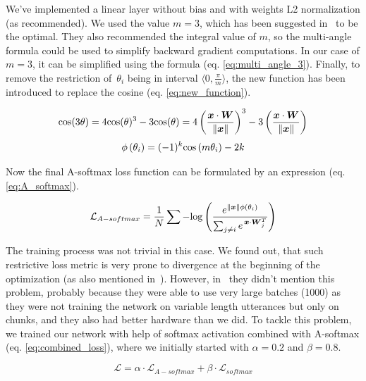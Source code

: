 \medskip
We've implemented a linear layer without bias and with weights L2 normalization (as recommended). We used the value $ m = 3 $, which has been suggested in~\cite{A_softmax} to be the optimal. They also recommended the integral value of $ m $, so the multi-angle formula could be used to simplify backward gradient computations. In our case of $ m = 3 $, it can be simplified using the formula (eq. \ref{eq:multi_angle_3}). Finally, to remove the restriction of~$ \theta_i $ being in interval $ \langle 0, \frac{\pi}{m} \rangle $, the new function has been introduced to replace the cosine (eq. \ref{eq:new_function}).

\begin{equation} \label{eq:multi_angle_3}
\textnormal{cos}(3\theta) =
4\textnormal{cos}(\theta)^3 - 3\textnormal{cos}(\theta) =
4 \left( \frac{\boldsymbol{x} \cdot \boldsymbol{W}}{\lVert\boldsymbol{x}\rVert} \right) ^3 -
3 \left( \frac{\boldsymbol{x} \cdot \boldsymbol{W}}{\lVert\boldsymbol{x}\rVert} \right)
\end{equation}
\begin{equation} \label{eq:new_function}
\phi \left( \theta_i \right) =
(-1)^k \textnormal{cos} \left( m \theta_i \right) - 2k
\end{equation}

\medskip
\noindent
Now the final A-softmax loss function can be formulated by an expression (eq. \ref{eq:A_softmax}).

\begin{equation} \label{eq:A_softmax}
\mathcal{L}_{A-softmax} = \frac{1}{N} \sum - \textnormal{log} \left(
\frac{e^{\lVert\boldsymbol{x}\rVert \phi(\theta_i)}}
{\sum_{j \neq i} e^{\,\boldsymbol{x} \cdot \boldsymbol{W}_j^T}}
\right)
\end{equation}

\medskip
\noindent
The training process was not trivial in this case. We found out, that such restrictive loss metric is very prone to divergence at the beginning of the optimization (as also mentioned in~\cite{arc_face}). However, in~\cite{A_softmax} they didn't mention this problem, probably because they were able to use very large batches (1000) as they were not training the network on variable length utterances but only on chunks, and they also had better hardware than we did. To tackle this problem, we trained our network with help of softmax activation combined with A-softmax (eq. \ref{eq:combined_loss}), where we initially started with $ \alpha = 0.2 $ and $ \beta = 0.8 $.

\begin{equation} \label{eq:combined_loss}
\mathcal{L} = \alpha \cdot \mathcal{L}_{A-softmax} + \beta \cdot \mathcal{L}_{softmax}
\end{equation}

